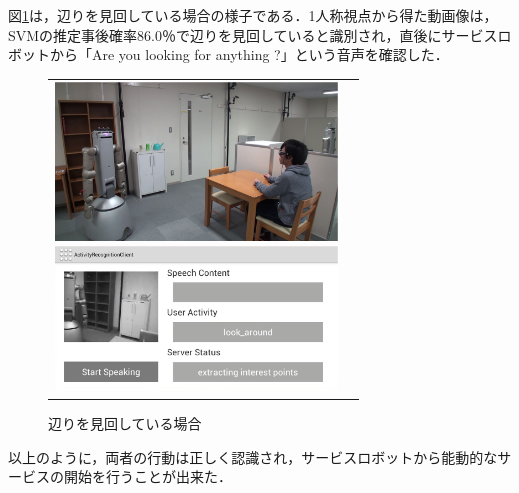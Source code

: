 図{\ref{fig:experiment_2_proactive_2}}は，辺りを見回している場合の様子である．1人称視点から得た動画像は，SVMの推定事後確率86.0％で辺りを見回していると識別され，直後にサービスロボットから「Are you looking for anything ?」という音声を確認した．
%
\vspace{5mm}
\begin{figure}[htbp]
\begin{tabular}{cc}
%
  \begin{minipage}{0.5\textwidth}
    \begin{center}
      \includegraphics[width=75mm]{figure/experiment_2_proactive_2.eps}
    \end{center}
  \end{minipage}
%
  \begin{minipage}{0.5\textwidth}
    \begin{center}
      \includegraphics[width=75mm]{figure/experiment_2_proactive_2_a.eps}
    \end{center}
  \end{minipage}
%
\end{tabular}
\caption{辺りを見回している場合}
\label{fig:experiment_2_proactive_2}
\end{figure}

以上のように，両者の行動は正しく認識され，サービスロボットから能動的なサービスの開始を行うことが出来た．